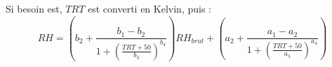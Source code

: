 Si besoin est, $TRT$ est converti en Kelvin, puis :
\[
RH = \left(b_2 + 
      \frac{b_1 - b_2}{1 + \left(\frac{TRT + 50 }{b_3}\right)^{b_4}}
     \right)
  RH_{brut}
+ \left(a_2 + 
      \frac{a_1 - a_2}{1 + \left(\frac{TRT + 50 }{a_3}\right)^{a_4}}
     \right)
\]

